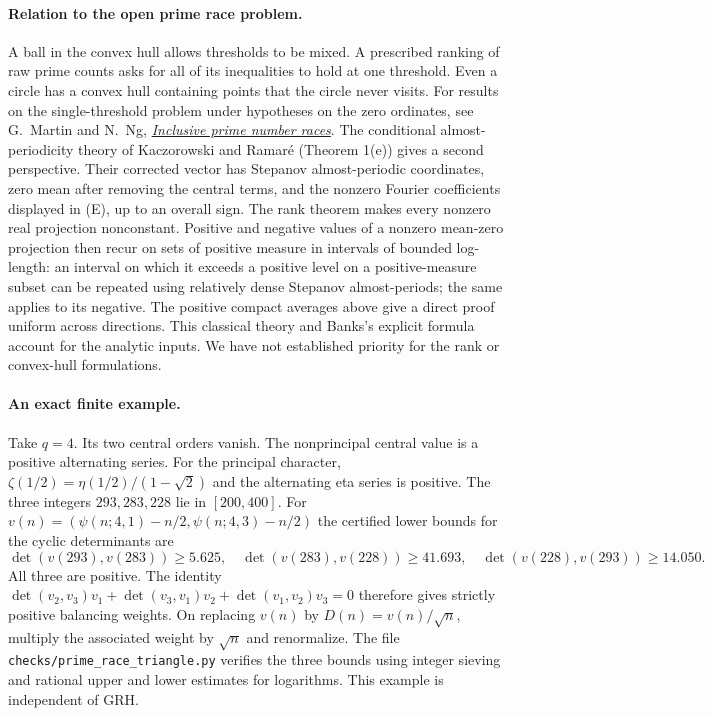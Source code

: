\paragraph{Relation to the open prime race problem.}
A ball in the convex hull allows thresholds to be mixed. A prescribed
ranking of raw prime counts asks for all of its inequalities to hold
at one threshold. Even a circle has a convex hull containing points
that the circle never visits. For results on the single-threshold
problem under hypotheses on the zero ordinates, see G.~Martin and
N.~Ng, \href{https://doi.org/10.1090/tran/7996}{\emph{Inclusive prime
number races}}. The conditional almost-periodicity theory of Kaczorowski and Ramar\'e
(Theorem 1(e)) gives a second perspective. Their corrected vector has
Stepanov almost-periodic coordinates, zero mean after removing the
central terms, and the nonzero Fourier coefficients displayed in (E),
up to an overall sign. The rank theorem makes every nonzero real
projection nonconstant. Positive and negative values of a nonzero
mean-zero projection then recur on sets of positive measure in
intervals of bounded log-length: an interval on which it exceeds a
positive level on a positive-measure subset can be repeated using
relatively dense Stepanov almost-periods; the same applies to its
negative. The positive compact averages above give a direct proof
uniform across directions. This classical theory and Banks's
explicit formula account for the analytic inputs. We have not
established priority for the rank or convex-hull formulations.

\paragraph{An exact finite example.}
Take $q=4$. Its two central orders vanish. The nonprincipal central
value is a positive alternating series. For the principal character,
$\zeta(1/2)=\eta(1/2)/(1-\sqrt2)$ and the alternating eta series is
positive. The three integers $293,283,228$ lie in $[200,400]$.
For $v(n)=(\psi(n;4,1)-n/2,\psi(n;4,3)-n/2)$ the certified lower
bounds for the cyclic determinants are
\[
 \det(v(293),v(283))\ge5.625,\quad
 \det(v(283),v(228))\ge41.693,\quad
 \det(v(228),v(293))\ge14.050.
\]
All three are positive. The identity
$\det(v_2,v_3)v_1+\det(v_3,v_1)v_2+\det(v_1,v_2)v_3=0$
therefore gives strictly positive balancing weights. On replacing
$v(n)$ by $D(n)=v(n)/\sqrt n$, multiply the associated weight by
$\sqrt n$ and renormalize. The file
\texttt{checks/prime\_race\_triangle.py} verifies the three bounds using
integer sieving and rational upper and lower estimates for logarithms.
This example is independent of GRH.
